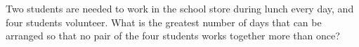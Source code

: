 Two students are needed to work in the school store during lunch every day, and four students volunteer. What is the greatest number of days that can be arranged so that no pair of the four students works together more than once?
